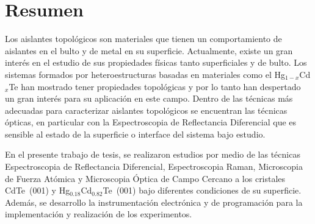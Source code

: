 \chapter{Resumen}
\label{chap:abstract}
Los aislantes topológicos son materiales que tienen un comportamiento de aislantes en el bulto y 
de metal en su superficie. Actualmente, existe un gran interés en el estudio de sus propiedades 
físicas tanto superficiales y de bulto. Los sistemas formados por \mbox{heteroestructuras} basadas en materiales como el \mbox{Hg$_{1-x}$Cd$_{x}$Te} han mostrado tener propiedades topológicas y por lo tanto han despertado un gran interés para su aplicación en este campo. Dentro de las técnicas más adecuadas para caracterizar aislantes topológicos se encuentran las técnicas ópticas, en particular con la Espectroscopia de Reflectancia Diferencial que es sensible al estado de la superficie o interface del sistema bajo estudio.

En el presente trabajo de tesis, se realizaron estudios por medio de las técnicas Espectroscopia de Reflectancia Diferencial, Espectroscopia Raman, Microscopia de Fuerza Atómica y Microscopia Óptica de Campo Cercano a los cristales \mbox{CdTe (001)} y \mbox{Hg$_{0.18}$Cd$_{0.82}$Te (001)} bajo diferentes condiciones de su superficie. Además, se desarrollo la instrumentación electrónica y de programación para la implementación y realización de los experimentos.